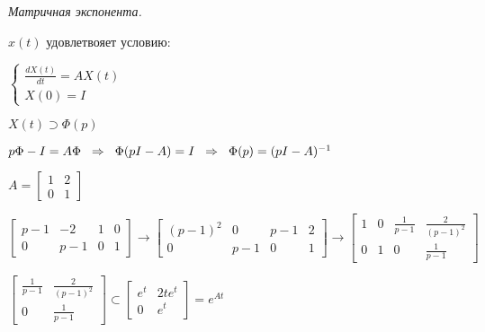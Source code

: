 \newpage
\begin{Large}
\textit{Матричная экспонента.}
\end{Large}

\vspace{0.5cm}
$
x(t) 
$
\hspace{0.2cm} удовлетвояет условию: 

\vspace{0.5cm}
$
\begin{cases}
\frac{dX(t)}{dt} = AX(t)
\\
X(0) = I
\end{cases}
$

\vspace{0.5cm}
$
X(t)\supset\Phi(p)
$

\vspace{0.5cm}
$
p\Phi - I  = A\Phi
\text{\hspace{0.2cm}}
\Rightarrow
\text{\hspace{0.2cm}}
\Phi(pI - A) = I
\text{\hspace{0.2cm}}
\Rightarrow
\text{\hspace{0.2cm}}
\Phi(p) = (pI-A)^{-1}
$

\vspace{0.5cm}
$
A = 
\begin{bmatrix}
1 &  2 \\
0 & 1
\end{bmatrix}
$

\vspace{0.5cm}
 $
\left[\begin{array}{cc|cc} 
p-1 & -2 & 1 & 0 \\
0 & p-1 & 0 & 1
\end{array}\right]
\rightarrow
\left[\begin{array}{cc|cc} 
(p-1)^2 & 0 & p-1 & 2 \\
0 & p-1 & 0 & 1
\end{array}\right]
\rightarrow
\left[\begin{array}{cc|cc} 
1 & 0 & \frac{1}{p-1} & \frac{2}{(p-1)^2} \\
0 & 1 & 0 & \frac{1}{p-1}
\end{array}\right]
$ 


\vspace{0.5cm}
$
\begin{bmatrix}
\frac{1}{p-1}  & \frac{2}{(p-1)^2}\\
0 & \frac{1}{p-1}
\end{bmatrix}
\subset
\begin{bmatrix}
e^t & 2te^t\\
0 & e^t
\end{bmatrix}
=
e^{At}
$


